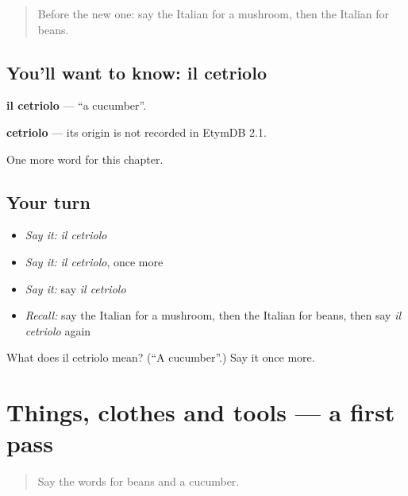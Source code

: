 \begin{quote}
Before the new one: say the Italian for a mushroom, then the Italian for beans.
\end{quote}

\subsection*{You'll want to know: il cetriolo}
\textbf{il cetriolo} — \textquotedblleft{}a cucumber\textquotedblright{}.

\begin{cousinweb}
\textbf{cetriolo} — its origin is not recorded in EtymDB 2.1.
\end{cousinweb}

\begin{grammarlens}[title={What you've built}]
One more word for this chapter.
\end{grammarlens}

\subsection*{Your turn}
\begin{itemize}
\raggedright
  \item \emph{Say it:} \emph{il cetriolo}
  \item \emph{Say it:} \emph{il cetriolo}, once more
  \item \emph{Say it:} say \emph{il cetriolo}
  \item \emph{Recall:} say the Italian for a mushroom, then the Italian for beans, then say \emph{il cetriolo} again
\end{itemize}

\begin{tcolorbox}[breakable,colback=teal!4,colframe=teal!35!black,title={Before you move on}]
What does il cetriolo mean? (\textquotedblleft{}A cucumber\textquotedblright{}.) Say it once more.
\end{tcolorbox}
\section[(dialogue)]{Things, clothes and tools — a first pass}

\label{lesson:IT-R106-first-pass-things-clothes-and-tools}



\begin{quote}
Say the words for beans and a cucumber.
\end{quote}

